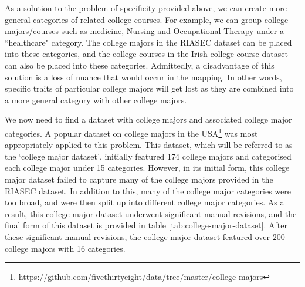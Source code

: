 As a solution to the problem of specificity provided above, we can create more general categories of related college courses.
For example, we can 
group college majors/courses such as medicine, Nursing and Occupational Therapy under a ``healthcare" category.
The college majors in the RIASEC dataset can be placed into these categories,
and the college courses in the Irish college course dataset can also be placed into these categories.
Admittedly, a disadvantage of this solution is a loss of nuance that would occur in the mapping.
In other words, specific traits of particular college majors 
will get lost as they are combined into a more general category with other college majors.

We now need to find a dataset with college majors and associated college major categories.
A popular dataset on college majors in the USA\footnote{\url{https://github.com/fivethirtyeight/data/tree/master/college-majors}} 
was most appropriately applied to this problem. This dataset, which will be referred to as the `college major dataset', initially featured 174 college majors and categorised each college major 
under 15 categories.
However, in its initial form, this college major dataset failed to capture many of the college majors provided in the RIASEC dataset.
In addition to this, many of the college major categories were too broad, and were then split up into different college major categories.
As a result, this college major dataset underwent significant manual revisions, and the final form of this dataset is provided in table \ref{tab:college-major-dataset}.
After these significant manual revisions, the college major dataset featured over 200 college majors with 16 categories.

\newpage

